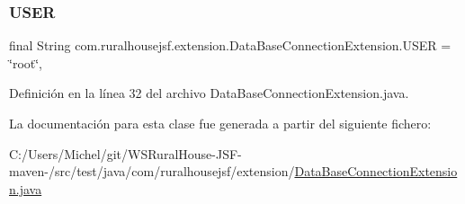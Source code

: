 \subsubsection{\texorpdfstring{USER}{USER}}
{\footnotesize\ttfamily final String com.\+ruralhousejsf.\+extension.\+Data\+Base\+Connection\+Extension.\+U\+S\+ER = \char`\"{}root\char`\"{}\hspace{0.3cm}{\ttfamily [static]}, {\ttfamily [private]}}



Definición en la línea 32 del archivo Data\+Base\+Connection\+Extension.\+java.



La documentación para esta clase fue generada a partir del siguiente fichero\+:\begin{DoxyCompactItemize}
\item 
C\+:/\+Users/\+Michel/git/\+W\+S\+Rural\+House-\/\+J\+S\+F-\/maven-\//src/test/java/com/ruralhousejsf/extension/\mbox{\hyperlink{_data_base_connection_extension_8java}{Data\+Base\+Connection\+Extension.\+java}}\end{DoxyCompactItemize}
